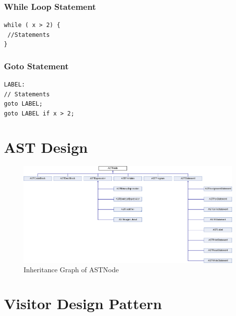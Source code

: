 \documentclass[12pt]{report}
\begin{document}
\subsubsection*{While Loop Statement}
\begin{lstlisting}
while ( x > 2) {
 //Statements
}
\end{lstlisting}

\subsubsection*{Goto Statement}
\begin{lstlisting}
LABEL:
// Statements
goto LABEL;
goto LABEL if x > 2;
\end{lstlisting}

\newpage
\section*{AST Design}
\begin{figure}[h]
  \includegraphics[width=\linewidth]{class_a_s_t_node.png}
  \caption{Inheritance Graph of ASTNode}
  \label{fig:figure1}
\end{figure}
\section*{Visitor Design Pattern}
\end{document}
